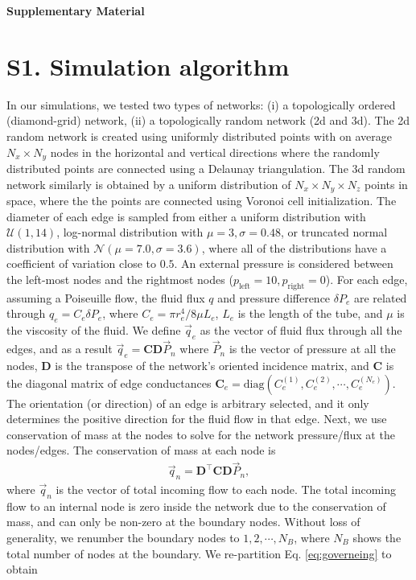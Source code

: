 \documentclass[%
reprint,
 amsmath,amssymb,
 aps,
prl,
]{revtex4-1}
\begin{document}
{\huge \textbf{Supplementary Material}}

\section{S1. Simulation algorithm}
\label{s1}
%
In our simulations, we tested two types of networks: (i) a topologically ordered (diamond-grid) network, (ii) a topologically random network (2d and 3d). 
The 2d random network is created using uniformly distributed points with on average $N_x\times N_y$ nodes in the horizontal and vertical directions where the randomly distributed points are connected using a Delaunay triangulation. The 3d random network similarly is obtained by a uniform distribution of $N_x\times N_y \times N_z$ points in space, where the the points are connected using Voronoi cell initialization. The diameter of each edge is sampled from either a uniform distribution with $\mathcal{U}(1,14)$, log-normal distribution with $\mu=3,\sigma=0.48$, or truncated normal distribution with $\mathcal{N}(\mu=7.0,\sigma=3.6)$, where all of the distributions have a coefficient of variation close to $0.5$.  An external pressure is considered between the left-most nodes and the rightmost nodes ($p_\text{left}=10,p_\text{right}=0$). For each edge, assuming a Poiseuille flow, the fluid flux  $q$ and pressure difference $\delta P_e$ are related through $q_e = C_e \delta P_e$, where $C_e = \pi r^4_e/8\mu L_e$,  $L_e$ is the length of the tube, and $\mu$ is the viscosity of the fluid. We define $\vec{q}_e$ as the vector of fluid flux through all the edges, and as a result $\vec{q}_e = \mathbf{C} \mathbf{D}\vec{P}_n$ where $\vec{P}_n$ is the vector of pressure at all the nodes, $\mathbf{D}$ is the transpose of the network's oriented incidence matrix, and $\mathbf{C}$ is the diagonal matrix of edge conductances $\mathbf{C}_e = \text{diag} \left( C^{(1)}_e, C^{(2)}_e, \cdots,C^{(N_e)}_e\right)$. The orientation (or direction) of an edge is arbitrary selected, and it only determines the positive direction for the fluid flow in that edge. Next, we  use conservation of mass at the nodes to solve for the network pressure/flux at the nodes/edges. The conservation of mass at each node is 
%
\begin{align}
    \vec{q}_n = \mathbf{D}^\top \mathbf{C} \mathbf{D} \vec{P}_n, \label{eq:governeing}
\end{align}
%
where $\vec{q}_n$ is the vector of total incoming flow to each node. The total incoming flow to an internal node is zero inside the network due to the conservation of mass, and can only be non-zero at the boundary nodes. Without loss of generality, we renumber the boundary nodes to $1,2,\cdots, N_{B}$, where $N_B$ shows the total number of nodes at the boundary. We re-partition Eq. \eqref{eq:governeing} to obtain 
\end{document}
